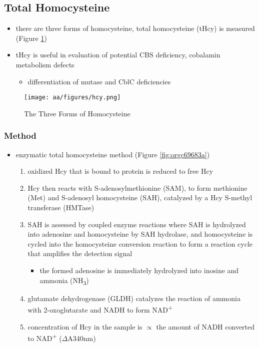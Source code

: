 \documentclass[12pt]{scrartcl}
\begin{document}
\subsection{Total Homocysteine}
\label{sec:org3b5b5ea}
\begin{itemize}
\item there are three forms of homocysteine, total homocysteine (tHcy) is
measured (Figure \ref{fig:org5174710})
\item tHcy is useful in evaluation of potential CBS deficiency, cobalamin
metabolism defects
\begin{itemize}
\item differentiation of mutase and CblC deficiencies
\end{itemize}
\end{itemize}


\begin{figure}[htbp]
\centering
\texttt{[image: aa/figures/hcy.png]}
\caption{\label{fig:org5174710}The Three Forms of Homocysteine}
\end{figure}

\subsubsection{Method}
\label{sec:org4c14a0b}
\begin{itemize}
\item enzymatic total homocysteine method (Figure \ref{fig:orgc69683a})
\begin{enumerate}
\item oxidized Hcy that is bound to protein is reduced to free Hcy
\item Hcy then reacts with S-adenosylmethionine (SAM), to form methionine
(Met) and S-adenosyl homocysteine (SAH), catalyzed by a Hcy
S-methyl transferase (HMTase)
\item SAH is assessed by coupled enzyme reactions where SAH is hydrolyzed
into adenosine and homocysteine by SAH hydrolase, and homocysteine
is cycled into the homocysteine conversion reaction to form a
reaction cycle that amplifies the detection signal
\begin{itemize}
\item the formed adenosine is immediately hydrolyzed into inosine and
ammonia (NH\textsubscript{3})
\end{itemize}
\item glutamate dehydrogenase (GLDH) catalyzes the reaction of ammonia
with 2-oxoglutarate and NADH to form NAD\textsuperscript{+}
\item concentration of Hcy in the sample is \(\propto\) the amount of NADH
converted to NAD\textsuperscript{+} (\(\Delta\)A340nm)
\end{enumerate}
\end{itemize}
\end{document}
